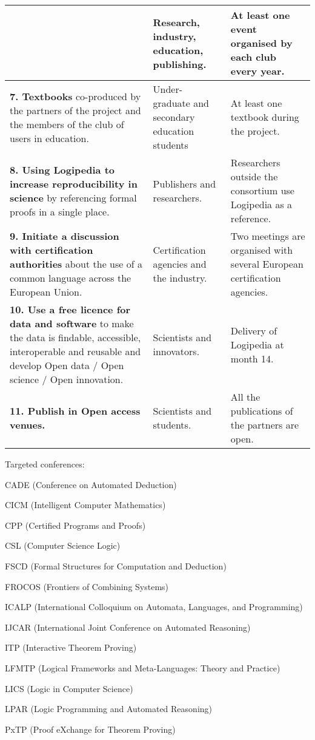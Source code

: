 \begin{longtable*}{|p{0.55\textwidth}|p{0.12\textwidth}|p{0.15\textwidth}|}
&
Research, industry,
education, publishing.
&
At least one event organised by each club every year.
\\
\hline
{\bf 7. Textbooks}
co-produced by 
the partners of the project and the members of
the club of users in education. 
&
Under- graduate and secondary education students
&
At least one textbook during the project.
\\
\hline
{\bf 8. Using Logipedia to increase reproducibility in science}
by referencing formal proofs in a single place. 
&
Publishers and researchers.
&
Researchers outside the consortium use Logipedia as a reference.
\\
\hline
{\bf 9. Initiate a discussion with certification authorities}
about the use of a common language across the European Union.
&
Certification agencies and the industry. 
&
Two meetings are organised with several European certification agencies.
\\
\hline
{\bf 10. Use a free licence for data and software} to make 
the data is findable, accessible, interoperable and reusable
and develop Open data / Open science / Open innovation.
&
Scientists and innovators.
&
Delivery of Logipedia at month 14.
\\
\hline
{\bf 11. Publish in Open access venues.}
&
Scientists and students.
&
All the publications of the partners are open.
\\
\hline
\end{longtable*}

Targeted conferences:
\begin{compactitem}
\item
  CADE (Conference on Automated Deduction)
\item
  CICM (Intelligent Computer Mathematics)
\item
  CPP (Certified Programs and Proofs)
\item
  CSL (Computer Science Logic)
\item
  FSCD (Formal Structures for Computation and Deduction)
\item
  FROCOS (Frontiers of Combining Systems)
\item
  ICALP (International Colloquium on Automata, Languages, and Programming)
\item
  IJCAR (International Joint Conference on Automated Reasoning)
\item
  ITP (Interactive Theorem Proving)
\item
LFMTP (Logical Frameworks and Meta-Languages: Theory
and Practice)
\item
  LICS (Logic in Computer Science)
\item
  LPAR (Logic Programming and Automated Reasoning)
\item
  PxTP (Proof eXchange for Theorem Proving)
\end{compactitem}
  
